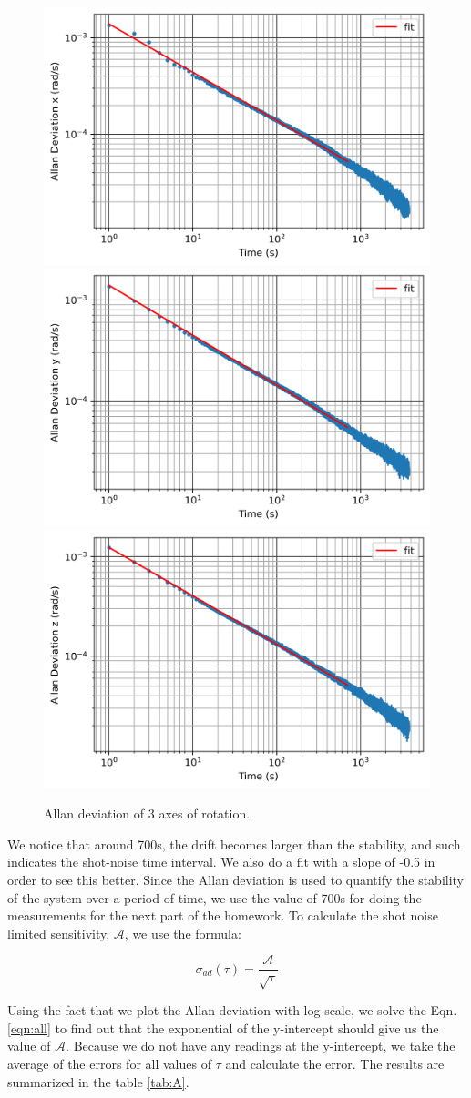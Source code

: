 \documentclass[a4paper]{article}
\begin{document}
\begin{figure}[hbt!]
     \centering
	 {{\includegraphics[width=0.4\columnwidth]{allan_x.png}}}
	 {{\includegraphics[width=0.4\columnwidth]{allan_y.png}}}
	 {{\includegraphics[width=0.4\columnwidth]{allan_z.png}}}
	 \caption{Allan deviation of 3 axes of rotation.}
	 \label{fig:fft}
\end{figure}

We notice that around 700s, the drift becomes larger than the stability, and such indicates the shot-noise time interval. We also do a fit with a slope of -0.5 in order to see this better. Since the Allan deviation is used to quantify the stability of the system over a period of time, we use the value of 700s for doing the measurements for the next part of the homework. 
To calculate the shot noise limited sensitivity, $\mathcal{A}$, we use the formula: 

\begin{equation} \label{eqn:all}
		\sigma_{ad}(\tau) = \frac{\mathcal{A}}{\sqrt{\tau}}
\end{equation}

Using the fact that we plot the Allan deviation with log scale, we solve the Eqn. \ref{eqn:all} to find out that the exponential of the y-intercept should give us the value of $\mathcal{A}$. Because we do not have any readings at the y-intercept, we take the average of the errors for all values of $\tau$ and calculate the error. The results are summarized in the table \ref{tab:A}.
\end{document}
